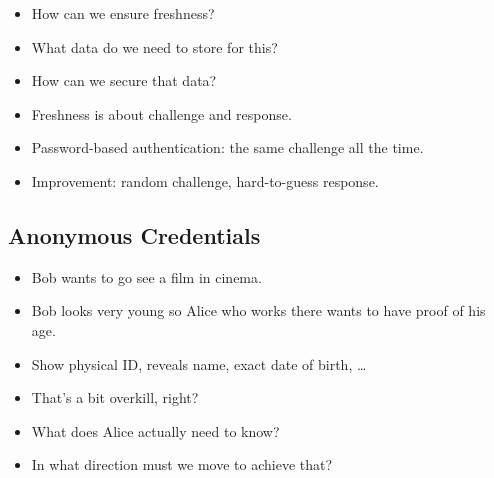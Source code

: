 \begin{frame}
  \begin{exercise}
    \begin{itemize}
      \item How can we ensure freshness?
      \item What data do we need to store for this?
      \item How can we secure that data?
    \end{itemize}
  \end{exercise}
\end{frame}

\begin{frame}
  \begin{solution}
    \begin{itemize}
      \item Freshness is about challenge and response.
      \item Password-based authentication: the same challenge all the time.
      \item Improvement: random challenge, hard-to-guess response.
    \end{itemize}
  \end{solution}
\end{frame}

\subsection{Anonymous Credentials}

\begin{frame}
  \begin{example}
    \begin{itemize}
      \item Bob wants to go see a film in cinema.
      \item Bob looks very young so Alice who works there wants to have proof 
        of his age.

        \pause{}

      \item Show physical ID, reveals name, exact date of birth, \dots
    \end{itemize}
  \end{example}

  \pause{}

  \begin{exercise}
    \begin{itemize}
      \item That's a bit overkill, right?
      \item What does Alice actually need to know?
      \item In what direction must we move to achieve that?
    \end{itemize}
  \end{exercise}
\end{frame}

